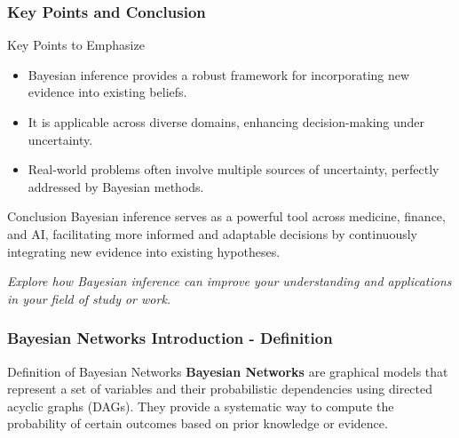 \documentclass[aspectratio=169]{beamer}
\begin{document}
\begin{frame}[fragile]
  \frametitle{Key Points and Conclusion}
  
  \begin{block}{Key Points to Emphasize}
    \begin{itemize}
      \item Bayesian inference provides a robust framework for incorporating new evidence into existing beliefs.
      \item It is applicable across diverse domains, enhancing decision-making under uncertainty.
      \item Real-world problems often involve multiple sources of uncertainty, perfectly addressed by Bayesian methods.
    \end{itemize}
  \end{block}

  \begin{block}{Conclusion}
    Bayesian inference serves as a powerful tool across medicine, finance, and AI, facilitating more informed and adaptable decisions by continuously integrating new evidence into existing hypotheses.
    
    \textit{Explore how Bayesian inference can improve your understanding and applications in your field of study or work.}
  \end{block}
\end{frame}

\begin{frame}[fragile]
    \frametitle{Bayesian Networks Introduction - Definition}
    \begin{block}{Definition of Bayesian Networks}
        \textbf{Bayesian Networks} are graphical models that represent a set of variables and their probabilistic dependencies using directed acyclic graphs (DAGs). 
        They provide a systematic way to compute the probability of certain outcomes based on prior knowledge or evidence.
    \end{block}
\end{frame}
\end{document}

